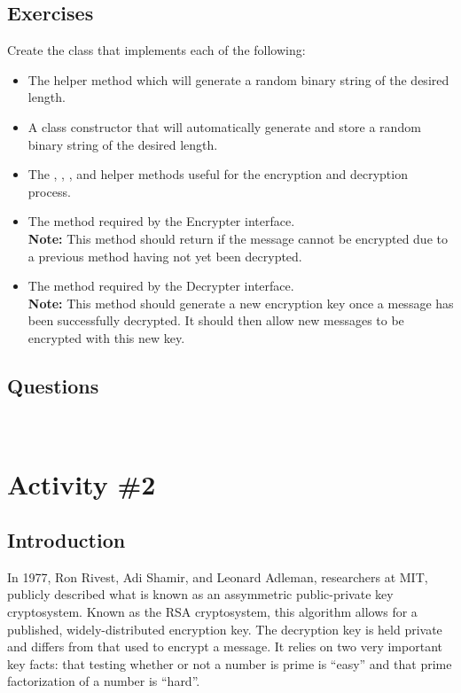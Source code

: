 		\subsection{Exercises}
			Create the  class that implements each of the following:
			\begin{itemize}
				\item The  helper method which will generate a random binary string of the desired length.
				\item A class constructor that will automatically generate and store a random binary string of the desired length.
				\item The , , , and  helper methods useful for the encryption and decryption process.
				\item The  method required by the Encrypter interface.\\
							{\small\textbf{Note:} This method should return  if the message cannot be encrypted due to a previous method having not yet been decrypted.}
				\item The  method required by the Decrypter interface.\\
							{\small\textbf{Note:} This method should generate a new encryption key once a message has been successfully decrypted. It should then allow new messages to be encrypted with this new key.}
			\end{itemize}

		\subsection{Questions}
			\ \\[9pt]
	\pagebreak

	\section{Activity \#2}
		\subsection{Introduction}
			In 1977, Ron Rivest, Adi Shamir, and Leonard Adleman, researchers at MIT, publicly described what is known as an assymmetric public-private key cryptosystem. Known as the RSA cryptosystem, this algorithm allows for a published, widely-distributed encryption key. The decryption key is held private and differs from that used to encrypt a message. It relies on two very important key facts: that testing whether or not a number is prime is ``easy'' and that prime factorization of a number is ``hard''.

